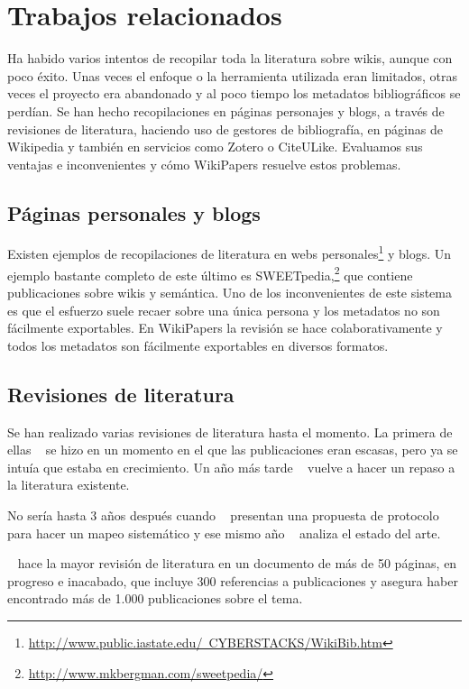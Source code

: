 \documentclass[11pt,twocolumn]{article}
\begin{document}
\section{Trabajos relacionados}
Ha habido varios intentos de recopilar toda la literatura sobre wikis, aunque con poco éxito. Unas veces el enfoque o la herramienta utilizada eran limitados, otras veces el proyecto era abandonado y al poco tiempo los metadatos bibliográficos se perdían. Se han hecho recopilaciones en páginas personajes y blogs, a través de revisiones de literatura, haciendo uso de gestores de bibliografía, en páginas de Wikipedia y también en servicios como Zotero o CiteULike. Evaluamos sus ventajas e inconvenientes y cómo WikiPapers resuelve estos problemas.

\subsection{Páginas personales y blogs}
Existen ejemplos de recopilaciones de literatura en webs personales\footnote{\href{http://www.public.iastate.edu/~CYBERSTACKS/WikiBib.htm}{http://www.public.iastate.edu/~CYBERSTACKS/WikiBib.htm}} y blogs. Un ejemplo bastante completo de este último es SWEETpedia,\footnote{\href{http://www.mkbergman.com/sweetpedia/}{http://www.mkbergman.com/sweetpedia/}} que contiene publicaciones sobre wikis y semántica. Uno de los inconvenientes de este sistema es que el esfuerzo suele recaer sobre una única persona y los metadatos no son fácilmente exportables. En WikiPapers la revisión se hace colaborativamente y todos los metadatos son fácilmente exportables en diversos formatos.

\subsection{Revisiones de literatura}
Se han realizado varias revisiones de literatura hasta el momento. La primera de ellas ~\citep{voss2005} se hizo en un momento en el que las publicaciones eran escasas, pero ya se intuía que estaba en crecimiento. Un año más tarde ~\citep{ayers2006} vuelve a hacer un repaso a la literatura existente.

No sería hasta 3 años después cuando ~\citep{okoli2009b} presentan una propuesta de protocolo para hacer un mapeo sistemático y ese mismo año ~\citep{okoli2009} analiza el estado del arte.

~\citep{nielsen2011} hace la mayor revisión de literatura en un documento de más de 50 páginas, en progreso e inacabado, que incluye 300 referencias a publicaciones y asegura haber encontrado más de 1.000 publicaciones sobre el tema.
\end{document}
